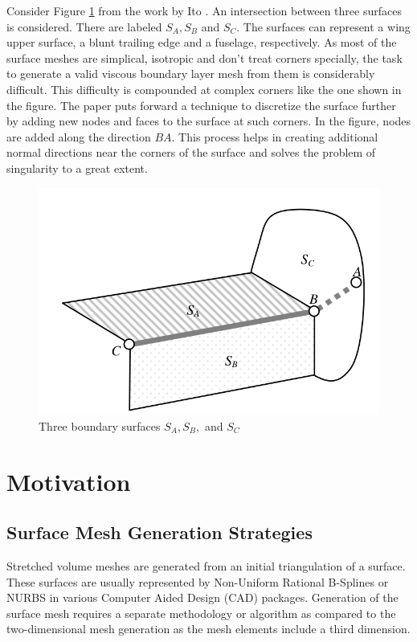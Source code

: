 Consider Figure \ref{fig-cornerIto} from the work by Ito \etal \cite{ito2007multiple}. An intersection between three surfaces is considered. There are labeled $S_A, S_B$ and $S_C$. The surfaces can represent a wing upper surface, a blunt trailing edge and a fuselage, respectively. As most of the surface meshes are simplical, isotropic and don't treat corners specially, the task to generate a valid viscous boundary layer mesh from them is considerably difficult. This difficulty is compounded at complex corners like the one shown in the figure. The paper puts forward a technique to discretize the surface further by adding new nodes and faces to the surface at such corners. In the figure, nodes are added along the direction $BA$. This process helps in creating additional normal directions near the corners of the surface and solves the problem of singularity to a great extent.

\begin{figure}
	\centering
	\includegraphics[width=0.8\linewidth]{img/intro/lit/cornerIto.png}
	\caption{Three boundary surfaces $S_A, S_B, $ and $S_C$ \cite{ito2007multiple}}
	\label{fig-cornerIto}
\end{figure}

\section{Motivation}
\label{sec-motivation}

\subsection{Surface Mesh Generation Strategies}

Stretched volume meshes are generated from an initial triangulation of a surface. These surfaces are usually represented by Non-Uniform Rational B-Splines or NURBS in various Computer Aided Design (CAD) packages. Generation of the surface mesh requires a separate methodology or algorithm as compared to the two-dimensional mesh generation as the mesh elements include a third dimension.

